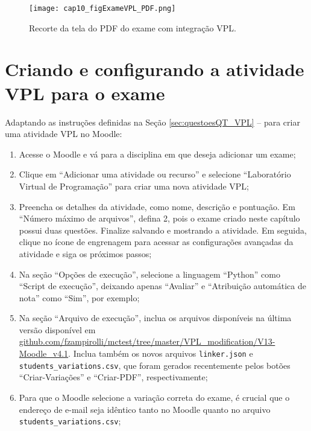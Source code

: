 \begin{figure}[htbp]
  \centering
  \texttt{[image: cap10\_figExameVPL\_PDF.png]}
  \caption{Recorte da tela do PDF do exame com integração VPL.}
  \label{fig:cap10_figExameVPL_PDF}
\end{figure}

\section{Criando e configurando a atividade VPL para o exame}

Adaptando as instruções definidas na Seção \ref{sec:questoesQT_VPL} --  para criar uma atividade VPL no Moodle:

\begin{enumerate}
    \item Acesse o Moodle e vá para a disciplina em que deseja adicionar um exame;
    \item Clique em ``Adicionar uma atividade ou recurso'' e selecione ``Laboratório Virtual de Programação'' para criar uma nova atividade VPL;

    \item Preencha os detalhes da atividade, como nome, descrição e pontuação. Em ``Número máximo de arquivos'', defina 2, pois o exame criado neste capítulo possui duas questões. Finalize salvando e mostrando a atividade. Em seguida, clique no ícone de engrenagem para acessar as configurações avançadas da atividade e siga os próximos passos;

    \item Na seção ``Opções de execução'', selecione a linguagem ``Python'' como ``Script de execução'', deixando apenas ``Avaliar'' e ``Atribuição automática de nota'' como ``Sim'', por exemplo;

    \item Na seção ``Arquivo de execução'', inclua os arquivos disponíveis na última versão disponível em \href{https://github.com/fzampirolli/mctest/tree/master/VPL_modification}{github.com/fzampirolli/mctest/tree/master/VPL\_modification/V13-Moodle\_v4.1}. 
    Inclua também os novos arquivos \verb|linker.json| e \verb|students_variations.csv|, que foram gerados recentemente pelos botões ``Criar-Variações'' e ``Criar-PDF'', respectivamente;

    \item Para que o Moodle selecione a variação correta do exame, é crucial que o endereço de e-mail seja idêntico tanto no Moodle quanto no arquivo \verb|students_variations.csv|; 


\end{enumerate}
